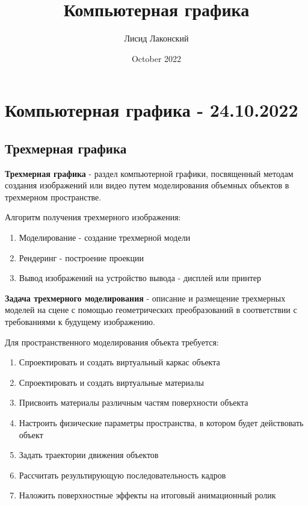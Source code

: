 \documentclass{article}
\title{Компьютерная графика}
\author{Лисид Лаконский}
\date{October 2022}
\begin{document}
\maketitle
\tableofcontents
\pagebreak

\section{Компьютерная графика - 24.10.2022}

\subsection{Трехмерная графика}

\begin{flushleft}

\textbf{Трехмерная графика} - раздел компьютерной графики, посвященный методам создания изображений или видео путем моделирования объемных объектов в трехмерном пространстве.

\hfill

Алгоритм получения трехмерного изображения:

\begin{enumerate}
    \item Моделирование - создание трехмерной модели
    \item Рендеринг - построение проекции
    \item Вывод изображений на устройство вывода - дисплей или принтер
\end{enumerate}

\textbf{Задача трехмерного моделирования} - описание и размещение трехмерных моделей на сцене с помощью геометрических преобразований в соответствии с требованиями к будущему изображению.

\hfill

Для пространственного моделирования объекта требуется:

\begin{enumerate}
    \item Спроектировать и создать виртуальный каркас объекта
    \item Спроектировать и создать виртуальные материалы
    \item Присвоить материалы различным частям поверхности объекта
    \item Настроить физические параметры пространства, в котором будет действовать объект
    \item Задать траектории движения объектов
    \item Рассчитать результирующую последовательность кадров
    \item Наложить поверхностные эффекты на итоговый анимационный ролик
\end{enumerate}


\end{flushleft}
\end{document}
